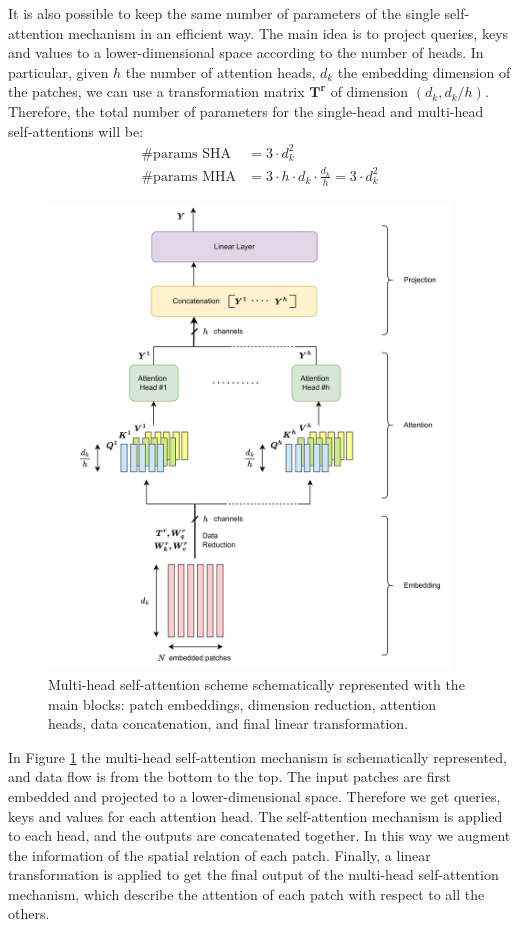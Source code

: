 It is also possible to keep the same number of parameters of the single 
self-attention mechanism in an efficient way. The main idea is to project queries, 
keys and values to a lower-dimensional space according to the number of heads.
In particular, given $h$ the number of attention heads, $d_k$ the embedding 
dimension of the patches, we can use a transformation matrix 
$\boldsymbol{T^r}$ of dimension $\left(d_k, d_k/h\right)$.
Therefore, the total number of parameters for
the single-head and multi-head self-attentions will be:
\begin{align*}
    \text{\#params SHA} &= 3 \cdot d_k^2 \\
    \text{\#params MHA} &= 3 \cdot h \cdot d_k \cdot\frac{d_k}{h} = 3 \cdot d_k^2
\end{align*}
\begin{figure}[htbp]
    \centering
    \includegraphics[width=0.95\textwidth]{images/vit/multi_head_attention_scheme.png}
    \caption{Multi-head self-attention scheme schematically represented with 
    the main blocks: patch embeddings, dimension reduction, attention heads, 
    data concatenation, and final linear transformation.}
    \label{fig:multi_head_attention}
\end{figure}
In Figure \ref{fig:multi_head_attention} the multi-head self-attention mechanism 
is schematically represented, and data flow is from the bottom to the top. 
The input patches are first embedded and projected to a lower-dimensional space. 
Therefore we get queries, keys and values for each attention head. 
The self-attention mechanism is applied to each head, and the outputs are 
concatenated together. In this way we augment the information of the spatial 
relation of each patch. Finally, a linear transformation is applied to get 
the final output of the multi-head self-attention mechanism, which describe the 
attention of each patch with respect to all the others.

